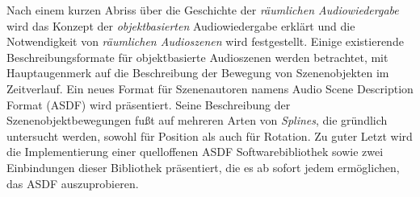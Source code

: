 Nach einem kurzen Abriss über die Geschichte
der \emph{räumlichen Audiowiedergabe}
wird das Konzept der \emph{objektbasierten} Audiowiedergabe erklärt
und die Notwendigkeit von \emph{räumlichen Audioszenen} wird festgestellt.
Einige existierende Beschreibungsformate für
objektbasierte Audioszenen werden betrachtet,
mit Hauptaugenmerk auf die Beschreibung der Bewegung von Szenenobjekten
im Zeitverlauf.
Ein neues Format für Szenenautoren namens
Audio Scene Description Format (ASDF) wird präsentiert.
Seine Beschreibung der Szenenobjektbewegungen fußt auf
mehreren Arten von \emph{Splines},
die gründlich untersucht werden,
sowohl für Position als auch für Rotation.
Zu guter Letzt wird die Implementierung
einer quelloffenen ASDF Softwarebibliothek sowie zwei Einbindungen dieser
Bibliothek präsentiert,
die es ab sofort jedem ermöglichen, das ASDF auszuprobieren.


